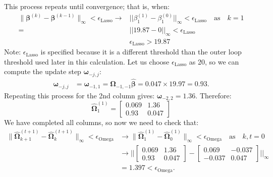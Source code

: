 \documentclass[11pt]{report} %
\begin{document}
This process repeats until convergence; that is, when:
\begin{align*}
\|\boldsymbol{\beta}^{(k)} - \boldsymbol{\beta}^{(k-1)}\|_{\infty} < \epsilon_\text{Lasso} \rightarrow &||{\beta^{(1)} _1}- {\beta^{(0)}_1}||_\infty  <\epsilon_\text{Lasso}\quad \text{as} \quad k=1\\
= &||19.87-0||_\infty < \epsilon_\text{Lasso}\\
& \epsilon_\text{Lasso} > 19.87
\end{align*}
Note: $\epsilon_\text{Lasso}$ is specified because it is a different threshold than the outer loop threshold used later in this calculation. Let us choose $\epsilon_\text{Lasso}$ as 20, so we can compute the update step $\boldsymbol{\omega}_{-j,j}$:
\begin{align*}
\boldsymbol{\omega}_{-j,j} &= \boldsymbol{\omega}_{-1,1} = \mathbf{\Omega}_{-1,-1}\boldsymbol{\hat{\beta}}=0.047 \times 19.97=0.93.
\end{align*}
\noindent Repeating this process for the 2nd column gives: $\boldsymbol{\omega}_{-2,2} = 1.36$. Therefore:
 \[
  \mathbf{\hat{\Omega}}^{(1)}_1 = \begin{bmatrix}
    0.069 & 1.36 \\
    0.93 & 0.047
  \end{bmatrix}
\]
We have completed all columns, so now we need to check that:
\begin{align*}
\|\boldsymbol{\hat{\Omega}}^{(t+1)}_{k+1} - \boldsymbol{\hat{\Omega}}^{(t+1)}_{k}\|_{\infty} < \epsilon_\text{Omega} &\rightarrow\|\boldsymbol{\hat{\Omega}}^{(1)}_{1} - \boldsymbol{\hat{\Omega}}^{(1)}_{0}\|_{\infty} < \epsilon_\text{Omega} \quad \text{as} \quad k,t = 0 \\
&\rightarrow ||\begin{bmatrix}
    0.069 & 1.36 \\
    0.93 & 0.047
  \end{bmatrix} -     \begin{bmatrix}
         0.069 & -0.037 \\
         -0.037 & 0.047
    \end{bmatrix}||_\infty\\
    &=1.397 < \epsilon_\text{Omega}.
\end{align*}

\end{document}
